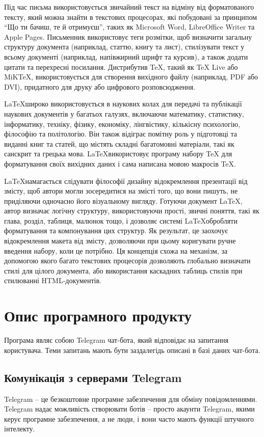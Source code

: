 \documentclass[a4paper,14pt]{extreport}
\begin{document}
    Під час письма використовується звичайний текст на відміну від форматованого тексту, який можна знайти в текстових процесорах, які побудовані за принципом ``Що ти бачиш, те й отримуєш'', таких як Microsoft Word, LibreOffice Writer та Apple Pages. Письменник використовує теги розмітки, щоб визначити загальну структуру документа (наприклад, статтю, книгу та лист), стилізувати текст у всьому документі (наприклад, напівжирний шрифт та курсив), а також додати цитати та перехресні посилання. Дистрибутив TeX, такий як TeX Live або MiKTeX, використовується для створення вихідного файлу (наприклад, PDF або DVI), придатного для друку або цифрового розповсюдження.

    \LaTeX широко використовується в наукових колах \cite{latex:friends} \cite{latex:oss-devs-latex} для передачі та публікації наукових документів у багатьох галузях, включаючи математику, статистику, інформатику, техніку, фізику, економіку, лінгвістику, кількісну психологію, філософію та політологію. Він також відіграє помітну роль у підготовці та виданні книг та статей, що містять складні багатомовні матеріали, такі як санскрит та грецька мова. \LaTeX використовує програму набору TeX для форматування своїх вихідних даних і сама написана мовою макросів TeX.

    \LaTeX намагається слідувати філософії дизайну відокремлення презентації від змісту, щоб автори могли зосередитися на змісті того, що вони пишуть, не приділяючи одночасно його візуальному вигляду. Готуючи документ \LaTeX, автор визначає логічну структуру, використовуючи прості, звичні поняття, такі як глава, розділ, таблиця, малюнок тощо, і дозволяє системі \LaTeX обробляти форматування та компонування цих структур. Як результат, це заохочує відокремлення макета від змісту, дозволяючи при цьому коригувати ручне введення набору, коли це потрібно. Ця концепція схожа на механізм, за допомогою якого багато текстових процесорів дозволяють глобально визначати стилі для цілого документа, або використання каскадних таблиць стилів при стилюванні HTML-документів.

\section{Опис програмного продукту}
    Програма являє собою Telegram чат-бота, який відповідає на запитання користувача. Теми запитань мають бути заздалегідь описані в базі даних чат-бота.

    \subsection{Комунікація з серверами Telegram}
    Telegram -- це безкоштовне програмне забезпечення для обміну повідомленнями. Telegram надає можливість створювати ботів -- просто акаунти Telegram, якими керує програмне забезпечення, а не люди, і вони часто мають функції штучного інтелекту.
\end{document}

